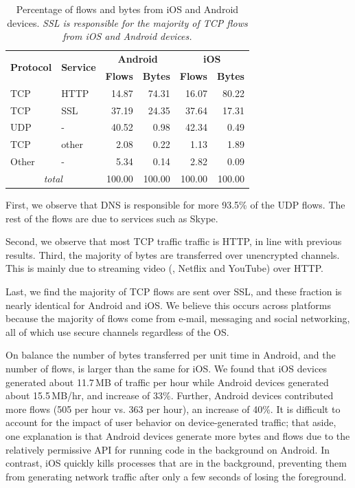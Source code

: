 \begin{table}
\begin{center}
\begin{tabular}{|l|l|r|r|r|r|}
\hline
\multirow{2}{*}{\bf Protocol} & \multirow{2}{*}{\bf Service} & \multicolumn{2}{|c|}{\bf Android} & \multicolumn{2}{|c|}{\bf iOS} \tabularnewline
\cline{3-6}
           &           &  \textbf{Flows}  &  \textbf{Bytes}  &  \textbf{Flows}  &  \textbf{Bytes}  \tabularnewline
\hline
 TCP       &  HTTP     &  14.87  &  74.31  &  16.07  &  80.22  \tabularnewline
\hline
TCP       &  SSL      &  37.19  &  24.35  &  37.64  &  17.31  \tabularnewline
\hline
 UDP       &  -        &  40.52  &   0.98  &  42.34  &   0.49  \tabularnewline
\hline
 TCP       &  other    &   2.08  &   0.22  &   1.13  &   1.89  \tabularnewline
\hline
 Other     &  -        &   5.34  &   0.14  &   2.82  &   0.09  \tabularnewline
\hline
\multicolumn{2}{|c|}{\emph{total}} & 100.00 & 100.00 & 100.00 & 100.00 \tabularnewline
\hline
\end{tabular}
\end{center}
\caption{Percentage of flows and bytes from iOS and Android devices. \emph{SSL is responsible for the majority of
    TCP flows from iOS and Android devices.}} 
\label{tab:summaryIOSAndroidTraffic}
\end{table}

First, we observe that DNS is responsible for more 93.5\% of
the UDP flows. The rest of the flows are due to services such as
Skype. 

Second, we observe that most TCP traffic
traffic is HTTP, in line with previous results. Third, the majority 
of bytes are transferred over unencrypted channels. This is mainly 
due to streaming video (\eg, Netflix and YouTube) over HTTP. 

Last, we find the majority 
of TCP flows are sent over SSL, and these fraction is nearly identical 
for Android and iOS. We believe this occurs across platforms because 
the majority of flows come from e-mail, messaging and social networking, 
all of which use secure channels regardless of the OS.  

On balance the number of bytes transferred per unit time in Android, 
and the number of flows, is larger than the same for iOS. We found that iOS 
devices generated about 11.7\,MB of traffic per hour while Android devices 
generated about 15.5\,MB/hr, and increase of 33\%. Further, Android devices 
contributed more flows (505 per hour vs. 363 per hour), an increase of 40\%. 
It is difficult to account for the impact of user behavior on device-generated 
traffic; that aside, one explanation is that Android devices generate more 
bytes and flows due to the relatively permissive API for running code in the 
background on Android. In contrast, iOS quickly kills processes that 
are in the background, preventing them from generating network 
traffic after only a few seconds of losing the foreground.

